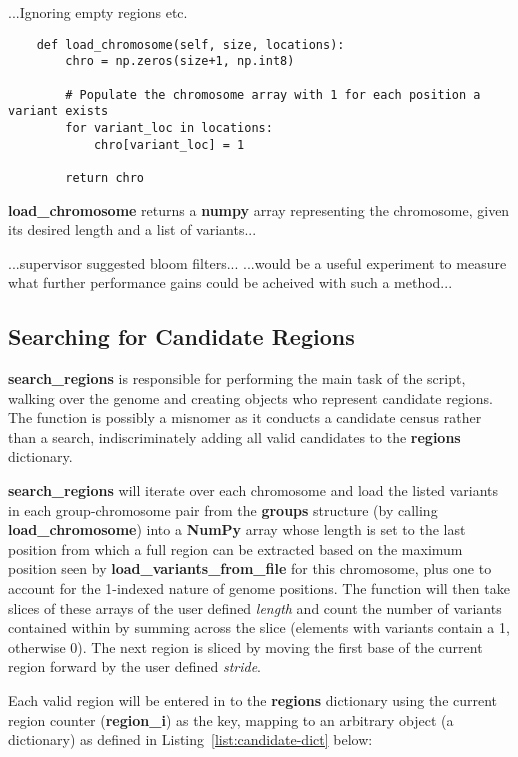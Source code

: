 ...Ignoring empty regions etc.

\begin{verbatim}
    def load_chromosome(self, size, locations):
        chro = np.zeros(size+1, np.int8)

        # Populate the chromosome array with 1 for each position a variant exists
        for variant_loc in locations:
            chro[variant_loc] = 1

        return chro
\end{verbatim}

\textbf{load\_chromosome} returns a \textbf{numpy} array representing the
chromosome, given its desired length and a list of variants...

...supervisor suggested bloom filters...
...would be a useful experiment to measure what further performance gains could
be acheived with such a method...


\subsection{Searching for Candidate Regions}

\textbf{search\_regions} is responsible for performing the main task of the
script, walking over the genome and creating objects who represent candidate
regions. The function is possibly a misnomer as it conducts a candidate census
rather than a search, indiscriminately adding all valid candidates to the
\textbf{regions} dictionary.

\textbf{search\_regions} will iterate over each chromosome and load the listed
variants in each group-chromosome pair from the \textbf{groups} structure (by
calling \textbf{load\_chromosome}) into a
\textbf{NumPy} array whose length is set to the last position from which a full
region can be extracted based on the maximum position seen by
\textbf{load\_variants\_from\_file} for this chromosome, plus one to account for
the 1-indexed nature of genome positions. The function will then take slices of
these arrays of the user defined \textit{length} and count the number of
variants contained within by summing across the slice (elements with variants
contain a 1, otherwise 0). The next region is sliced by moving the first base of
the current region forward by the user defined \textit{stride}.

Each valid region will be entered in to the \textbf{regions} dictionary using
the current region counter (\textbf{region\_i}) as the key, mapping to an
arbitrary object (a dictionary) as defined in Listing~\ref{list:candidate-dict}
below:

